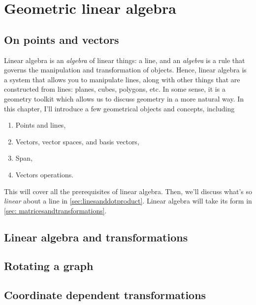 \chapter{Geometric linear algebra}

\section{On points and vectors}

Linear algebra is an \emph{algebra} of linear things: a line, and an \emph{algebra} is a rule that governs the manipulation and transformation of objects. Hence, linear algebra is a system that allows you to manipulate lines, along with other things that are constructed from lines: planes, cubes, polygons, etc. In some sense, it is a geometry toolkit which allows us to discuss geometry in a more natural way. In this chapter, I'll introduce a few geometrical objects and concepts, including
\begin{enumerate}[noitemsep]
  \item Points and lines,
  \item Vectors, vector spaces, and basis vectors,
  \item Span,
  \item Vectors operations.
\end{enumerate}
This will cover all the prerequisites of linear algebra. Then, we'll discuss what's so \emph{linear} about a
line in \cref{sec:linesanddotproduct}. Linear algebra will take its form in \cref{sec:
  matricesandtransformations}.


\section{Linear algebra and transformations}

\section{Rotating a graph}

\section{Coordinate dependent transformations}

